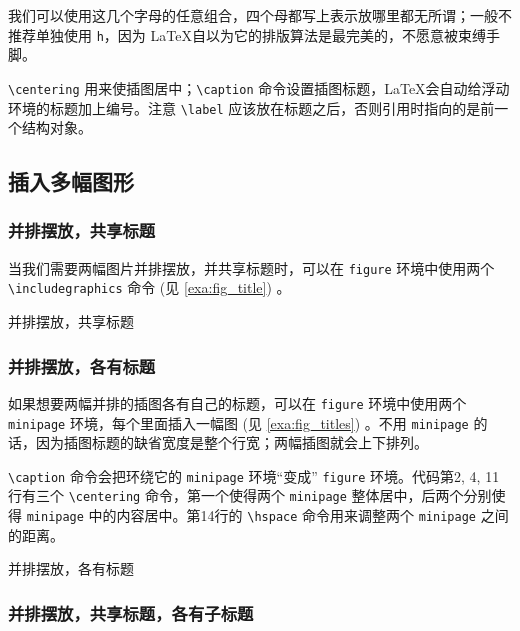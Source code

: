 我们可以使用这几个字母的任意组合，四个母都写上表示放哪里都无所谓；一般不推荐单独使用 \texttt{h}，因为 \LaTeX 自以为它的排版算法是最完美的，不愿意被束缚手脚。

\verb|\centering| 用来使插图居中；\verb|\caption| 命令设置插图标题，\LaTeX 会自动给浮动环境的标题加上编号。注意 \verb|\label| 应该放在标题之后，否则引用时指向的是前一个结构对象。

\subsection{插入多幅图形}
\subsubsection{并排摆放，共享标题}

当我们需要两幅图片并排摆放，并共享标题时，可以在 \texttt{figure} 环境中使用两个 \verb|\includegraphics| 命令 (见 \autoref{exa:fig_title}) 。

\begin{example}[h]
\caption{并排摆放，共享标题}
\label{exa:fig_title}
\end{example}

\subsubsection{并排摆放，各有标题}

如果想要两幅并排的插图各有自己的标题，可以在 \texttt{figure} 环境中使用两个 \texttt{minipage} 环境，每个里面插入一幅图 (见 \autoref{exa:fig_titles}) 。不用 \texttt{minipage} 的话，因为插图标题的缺省宽度是整个行宽；两幅插图就会上下排列。

\verb|\caption| 命令会把环绕它的 \texttt{minipage} 环境“变成” \texttt{figure} 环境。代码第2, 4, 11行有三个 \verb|\centering| 命令，第一个使得两个 \texttt{minipage} 整体居中，后两个分别使得 \texttt{minipage} 中的内容居中。第14行的 \verb|\hspace| 命令用来调整两个 \texttt{minipage} 之间的距离。


\begin{example}[h]
\caption{并排摆放，各有标题}
\label{exa:fig_titles}
\end{example}

\subsubsection{并排摆放，共享标题，各有子标题}

